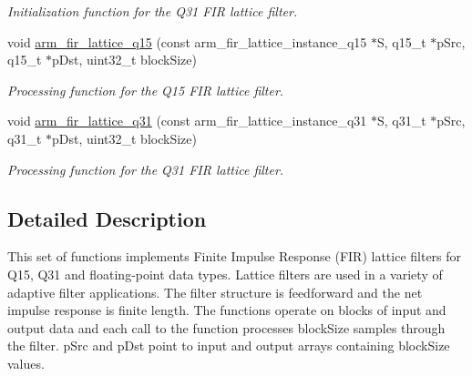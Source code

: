\begin{DoxyCompactItemize}
\begin{DoxyCompactList}\small\item\em Initialization function for the Q31 F\+IR lattice filter. \end{DoxyCompactList}\item 
void \hyperlink{group__FIR__Lattice_gabb0ab07fd313b4d863070c3ddca51542}{arm\+\_\+fir\+\_\+lattice\+\_\+q15} (const arm\+\_\+fir\+\_\+lattice\+\_\+instance\+\_\+q15 $\ast$S, q15\+\_\+t $\ast$p\+Src, q15\+\_\+t $\ast$p\+Dst, uint32\+\_\+t block\+Size)
\begin{DoxyCompactList}\small\item\em Processing function for the Q15 F\+IR lattice filter. \end{DoxyCompactList}\item 
void \hyperlink{group__FIR__Lattice_ga2e36fd210e4a1a5dd333ce80dd6d9a88}{arm\+\_\+fir\+\_\+lattice\+\_\+q31} (const arm\+\_\+fir\+\_\+lattice\+\_\+instance\+\_\+q31 $\ast$S, q31\+\_\+t $\ast$p\+Src, q31\+\_\+t $\ast$p\+Dst, uint32\+\_\+t block\+Size)
\begin{DoxyCompactList}\small\item\em Processing function for the Q31 F\+IR lattice filter. \end{DoxyCompactList}\end{DoxyCompactItemize}


\subsection{Detailed Description}
This set of functions implements Finite Impulse Response (F\+IR) lattice filters for Q15, Q31 and floating-\/point data types. Lattice filters are used in a variety of adaptive filter applications. The filter structure is feedforward and the net impulse response is finite length. The functions operate on blocks of input and output data and each call to the function processes {\ttfamily block\+Size} samples through the filter. {\ttfamily p\+Src} and {\ttfamily p\+Dst} point to input and output arrays containing {\ttfamily block\+Size} values.

